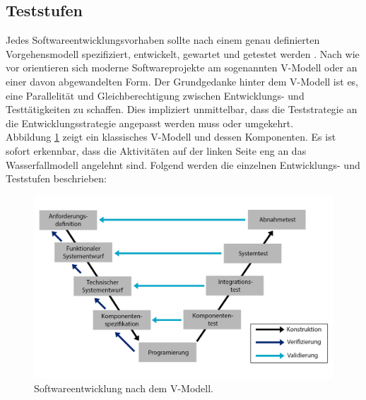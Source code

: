 \subsection{Teststufen}
\label{sec:teststufen}
Jedes Softwareentwicklungsvorhaben sollte nach einem genau definierten Vorgehensmodell spezifiziert, entwickelt, gewartet und getestet werden \cite{spillner_basiswissen_2012}. Nach wie vor orientieren sich moderne Softwareprojekte am sogenannten V-Modell \cite{boehm_verifying_1984} oder an einer davon abgewandelten Form. Der Grundgedanke hinter dem V-Modell ist es, eine Parallelität und Gleichberechtigung zwischen Entwicklungs- und Testtätigkeiten zu schaffen. Dies impliziert unmittelbar, dass die Teststrategie an die Entwicklungsstrategie angepasst werden muss oder umgekehrt.\\

Abbildung \ref{fig:v_modell} zeigt ein klassisches V-Modell und dessen Komponenten. Es ist sofort erkennbar, dass die Aktivitäten auf der linken Seite eng an das Wasserfallmodell \cite{grechenig_softwaretechnik:_2010} angelehnt sind. Folgend werden die einzelnen Entwicklungs- und Teststufen beschrieben:

\begin{figure}[h] 
  \centering
     \includegraphics[width=1\textwidth]{figures/v_modell.png}
  \caption{Softwareentwicklung nach dem V-Modell.}
  \label{fig:v_modell}
\end{figure}



